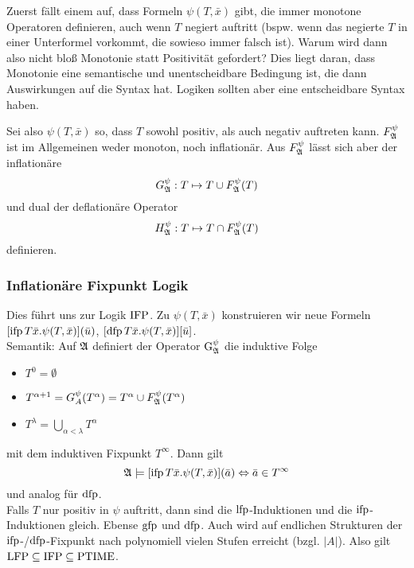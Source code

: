 Zuerst fällt einem auf, dass Formeln $\psi(T,\bar{x})$ gibt, die immer monotone Operatoren definieren, auch wenn $T$ negiert auftritt (bspw. wenn das negierte $T$ in einer Unterformel vorkommt, die sowieso immer falsch ist). 
Warum wird dann also nicht bloß Monotonie statt Positivität gefordert? Dies liegt daran, dass Monotonie eine semantische und unentscheidbare Bedingung ist, die dann Auswirkungen auf die Syntax hat. 
Logiken sollten aber eine entscheidbare Syntax haben.

Sei also $\psi(T,\bar{x})$ so, dass $T$ sowohl positiv, als auch negativ auftreten kann. $F^\psi_{\mathfrak{A}}$ ist im Allgemeinen weder monoton, noch inflationär. 
Aus $F^\psi_{\mathfrak{A}}$ lässt sich aber der inflationäre 
\[G^\psi_{\mathfrak{A}}:T\mapsto T\cup F^\psi_{\mathfrak{A}}(T)\]
und dual der deflationäre Operator
\[H^\psi_{\mathfrak{A}} : T \mapsto T\cap F^\psi_{\mathfrak{A}}(T)\]
definieren.

\subsubsection*{Inflationäre Fixpunkt Logik}

Dies führt uns zur Logik $\operatorname{IFP}$. Zu $\psi(T,\bar{x})$ konstruieren wir neue Formeln $[\operatorname{ifp} T\bar{x} . \psi(T,\bar{x})](\bar{u})$, $[\operatorname{dfp} T\bar{x}.\psi(T,\bar{x})][\bar{u}]$. 
\\
Semantik: Auf $\mathfrak{A}$ definiert der Operator $\operatorname{G}^\psi_{\mathfrak{A}}$ die induktive Folge 
\begin{itemize}
	\item $T^0=\emptyset$
	\item $T^{\alpha+1}=G^\psi_A(T^\alpha)=T^\alpha \cup F^\psi_{\mathfrak{A}}(T^\alpha)$
	\item $T^\lambda=\bigcup_{\alpha<\lambda} T^\alpha$
\end{itemize}
mit dem induktiven Fixpunkt $T^\infty$. Dann gilt 
\[\mathfrak{A}\models [\operatorname{ifp} T\bar{x} . \psi(T,\bar{x})](\bar{a}) \Leftrightarrow\bar{a}\in T^\infty\]
und analog für $\operatorname{dfp}$.
\\
Falls $T$ nur positiv in $\psi$ auftritt, dann sind die $\operatorname{lfp}$-Induktionen und die $\operatorname{ifp}$-Induktionen gleich. Ebense $\operatorname{gfp}$ und $\operatorname{dfp}$. Auch wird auf endlichen Strukturen der $\operatorname{ifp}$-/$\operatorname{dfp}$-Fixpunkt nach polynomiell vielen Stufen erreicht (bzgl. $\vert A \vert$). Also gilt $\operatorname{LFP} \subseteq \operatorname{IFP} \subseteq \operatorname{PTIME}$.

